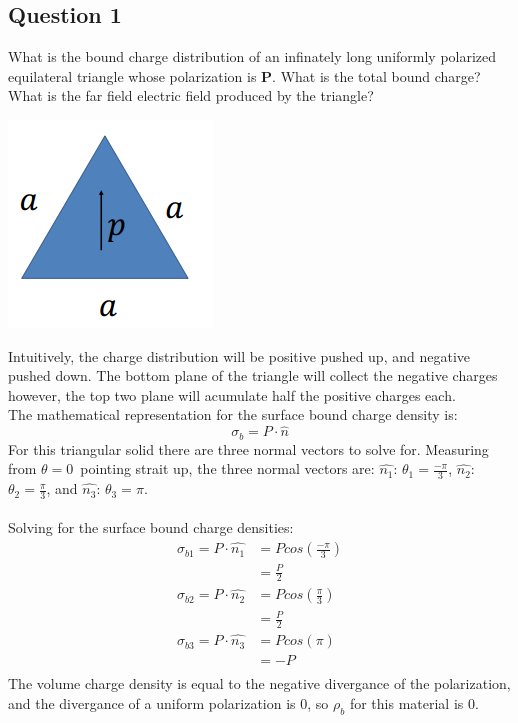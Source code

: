 \documentclass[a4paper,landscape]{article}
\newcommand{\F}[2]{\ensuremath{\frac{#1}{#2}}}
\newcommand{\V}{\mathbf{}}
\begin{document}
\begin{landscape}

\subsection*{Question 1}
What is the bound charge distribution of an infinately long uniformly
polarized equilateral triangle whose polarization is \textbf{P}.  What
is the total bound charge? What is the far field electric field
produced by the triangle?\\

\begin{center}
\includegraphics{Triangle-Dielectric.png}
\end{center}

Intuitively, the charge distribution will be positive pushed up, and negative pushed down.  The bottom plane of the triangle will collect the negative charges however, the top two plane will acumulate half the positive charges each.\\  The mathematical representation for the surface bound charge density is:
\[\sigma_b=\V{P}\cdot\hat{n}\]
For this triangular solid there are three normal vectors to solve for.  Measuring from $\theta=0$~pointing strait up, the three normal vectors are: $\hat{n_1}$: $\theta_1=\F{-\pi}{3}$, $\hat{n_2}$: $\theta_2=\F{\pi}{3}$, and $\hat{n_3}$: $\theta_3=\pi$.\\ \\
Solving for the surface bound charge densities:
\begin{align*}
\sigma_{b1}=\V{P}\cdot\hat{n_1}&=Pcos(\F{-\pi}{3})\\
&=\F{P}{2}\\
\sigma_{b2}=\V{P}\cdot\hat{n_2}&=Pcos(\F{\pi}{3})\\
&=\F{P}{2}\\
\sigma_{b3}=\V{P}\cdot\hat{n_3}&=Pcos(\pi)\\
&=-P\\
\end{align*}
The volume charge density is equal to the negative divergance of the polarization, and the divergance of a uniform polarization is 0, so $\rho_b$ for this material is 0.


\end{landscape}
\end{document}
